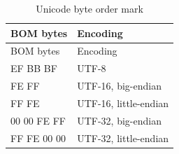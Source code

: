 \begin{longtable}[]{@{}ll@{}}
\caption{Unicode byte order mark}\tabularnewline
\toprule
\begin{minipage}[b]{0.47\columnwidth}\raggedright\strut
BOM bytes\strut
\end{minipage} & \begin{minipage}[b]{0.47\columnwidth}\raggedright\strut
Encoding\strut
\end{minipage}\tabularnewline
\midrule
\endfirsthead
\toprule
\begin{minipage}[b]{0.47\columnwidth}\raggedright\strut
BOM bytes\strut
\end{minipage} & \begin{minipage}[b]{0.47\columnwidth}\raggedright\strut
Encoding\strut
\end{minipage}\tabularnewline
\midrule
\endhead
\begin{minipage}[t]{0.47\columnwidth}\raggedright\strut
EF BB BF\strut
\end{minipage} & \begin{minipage}[t]{0.47\columnwidth}\raggedright\strut
UTF-8\strut
\end{minipage}\tabularnewline
\begin{minipage}[t]{0.47\columnwidth}\raggedright\strut
FE FF\strut
\end{minipage} & \begin{minipage}[t]{0.47\columnwidth}\raggedright\strut
UTF-16, big-endian\strut
\end{minipage}\tabularnewline
\begin{minipage}[t]{0.47\columnwidth}\raggedright\strut
FF FE\strut
\end{minipage} & \begin{minipage}[t]{0.47\columnwidth}\raggedright\strut
UTF-16, little-endian\strut
\end{minipage}\tabularnewline
\begin{minipage}[t]{0.47\columnwidth}\raggedright\strut
00 00 FE FF\strut
\end{minipage} & \begin{minipage}[t]{0.47\columnwidth}\raggedright\strut
UTF-32, big-endian\strut
\end{minipage}\tabularnewline
\begin{minipage}[t]{0.47\columnwidth}\raggedright\strut
FF FE 00 00\strut
\end{minipage} & \begin{minipage}[t]{0.47\columnwidth}\raggedright\strut
UTF-32, little-endian\strut
\end{minipage}\tabularnewline
\bottomrule
\end{longtable}


